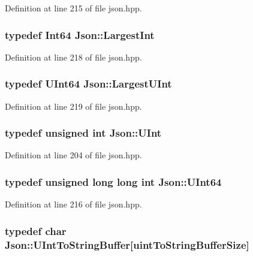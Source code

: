 Definition at line 215 of file json.\-hpp.

\hypertarget{namespace_json_a218d880af853ce786cd985e82571d297}{
\subsubsection[{Largest\-Int}]{\setlength{\rightskip}{0pt plus 5cm}typedef {\bf Int64} {\bf Json\-::\-Largest\-Int}}}\label{namespace_json_a218d880af853ce786cd985e82571d297}


Definition at line 218 of file json.\-hpp.

\hypertarget{namespace_json_ae202ecad69725e23443f465e257456d0}{
\subsubsection[{Largest\-U\-Int}]{\setlength{\rightskip}{0pt plus 5cm}typedef {\bf U\-Int64} {\bf Json\-::\-Largest\-U\-Int}}}\label{namespace_json_ae202ecad69725e23443f465e257456d0}


Definition at line 219 of file json.\-hpp.

\hypertarget{namespace_json_a800fb90eb6ee8d5d62b600c06f87f7d4}{
\subsubsection[{U\-Int}]{\setlength{\rightskip}{0pt plus 5cm}typedef unsigned int {\bf Json\-::\-U\-Int}}}\label{namespace_json_a800fb90eb6ee8d5d62b600c06f87f7d4}


Definition at line 204 of file json.\-hpp.

\hypertarget{namespace_json_a01f20bce8f8229f38ff890168c0e6452}{
\subsubsection[{U\-Int64}]{\setlength{\rightskip}{0pt plus 5cm}typedef unsigned long long int {\bf Json\-::\-U\-Int64}}}\label{namespace_json_a01f20bce8f8229f38ff890168c0e6452}


Definition at line 216 of file json.\-hpp.

\hypertarget{namespace_json_a602bcf69c2042fb61c3b243cb16f04ca}{
\subsubsection[{U\-Int\-To\-String\-Buffer}]{\setlength{\rightskip}{0pt plus 5cm}typedef char Json\-::\-U\-Int\-To\-String\-Buffer\mbox{[}{\bf uint\-To\-String\-Buffer\-Size}\mbox{]}}}\label{namespace_json_a602bcf69c2042fb61c3b243cb16f04ca}


